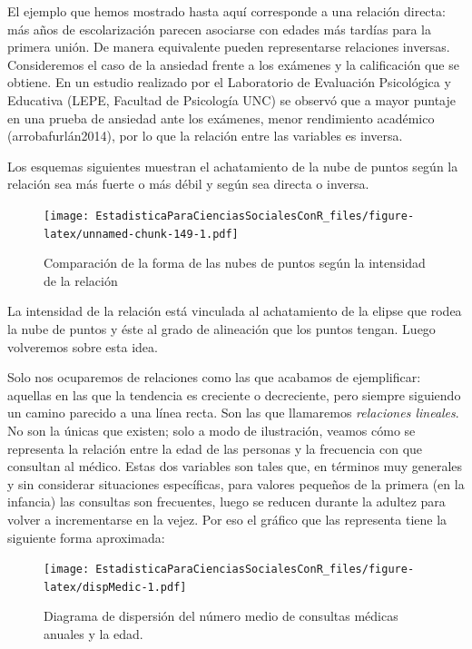 \documentclass[]{book}
\begin{document}
El ejemplo que hemos mostrado hasta aquí corresponde a una relación directa: más años de escolarización parecen asociarse con edades más tardías para la primera unión. De manera equivalente pueden representarse relaciones inversas. Consideremos el caso de la ansiedad frente a los exámenes y la calificación que se obtiene. En un estudio realizado por el Laboratorio de Evaluación Psicológica y Educativa (LEPE, Facultad de Psicología UNC) se observó que a mayor puntaje en una prueba de ansiedad ante los exámenes, menor rendimiento académico (arrobafurlán2014), por lo que la relación entre las variables es inversa.

Los esquemas siguientes muestran el achatamiento de la nube de puntos según la relación sea más fuerte o más débil y según sea directa o inversa.

\begin{figure}
\centering
\texttt{[image: EstadisticaParaCienciasSocialesConR\_files/figure-latex/unnamed-chunk-149-1.pdf]}
\caption{\label{fig:unnamed-chunk-149}Comparación de la forma de las nubes de puntos según la intensidad de la relación}
\end{figure}

La intensidad de la relación está vinculada al achatamiento de la elipse
que rodea la nube de puntos y éste al grado de alineación que los puntos
tengan. Luego volveremos sobre esta idea.

Solo nos ocuparemos de relaciones como las que acabamos de ejemplificar:
aquellas en las que la tendencia es creciente o decreciente, pero
siempre siguiendo un camino parecido a una línea recta. Son las que
llamaremos \emph{relaciones lineales}. No son la únicas que existen; solo a
modo de ilustración, veamos cómo se representa la relación entre la edad
de las personas y la frecuencia con que consultan al médico. Estas dos
variables son tales que, en términos muy generales y sin considerar
situaciones específicas, para valores pequeños de la primera (en la
infancia) las consultas son frecuentes, luego se reducen durante la
adultez para volver a incrementarse en la vejez. Por eso el gráfico que las representa tiene la siguiente forma aproximada:

\begin{figure}
\centering
\texttt{[image: EstadisticaParaCienciasSocialesConR\_files/figure-latex/dispMedic-1.pdf]}
\caption{\label{fig:dispMedic}Diagrama de dispersión del número medio de consultas médicas anuales y la edad.}
\end{figure}
\end{document}
